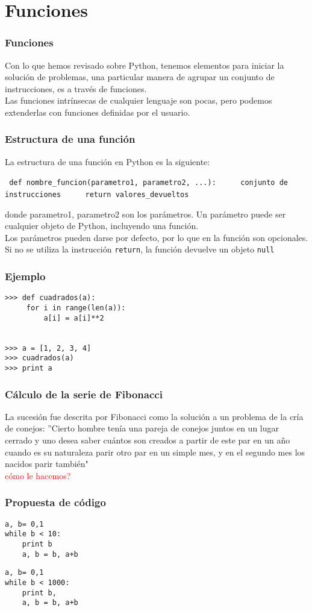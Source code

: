 \documentclass[12pt]{beamer}
\begin{document}
\section{Funciones}
\begin{frame}
\frametitle{Funciones}
Con lo que hemos revisado sobre Python, tenemos elementos para iniciar la soluci\'{o}n de problemas, una particular manera de agrupar un conjunto de instrucciones, es a trav\'{e}s de funciones.
\\
\bigskip
Las funciones intr\'{i}nsecas de cualquier lenguaje son pocas, pero podemos extenderlas con funciones definidas por el usuario.
\end{frame}
\begin{frame}[fragile]
\frametitle{Estructura de una funci\'{o}n}
La estructura de una funci\'{o}n en Python es la siguiente:
\begin{center}
\begin{exampleblock}{}
\verb| def nombre_funcion(parametro1, parametro2, ...):|
\verb|     conjunto de instrucciones|
\verb|     return valores_devueltos|
\end{exampleblock}
\end{center}
donde parametro1, parametro2 son los par\'{a}metros. Un par\'{a}metro puede ser cualquier objeto de Python, incluyendo una funci\'{o}n.
\\
\medskip
Los par\'{a}metros pueden darse por defecto, por lo que en la funci\'{o}n son opcionales. Si no se utiliza la instrucci\'{o}n \texttt{return}, la funci\'{o}n devuelve un objeto \texttt{null}
\end{frame}
\begin{frame}[fragile]
\frametitle{Ejemplo}
\begin{lstlisting}
>>> def cuadrados(a):
     for i in range(len(a)):
         a[i] = a[i]**2


>>> a = [1, 2, 3, 4]
>>> cuadrados(a)
>>> print a
\end{lstlisting}
\end{frame}
\begin{frame}
\frametitle{C\'{a}lculo de la serie de Fibonacci}
La sucesi\'{o}n fue descrita por Fibonacci como la soluci\'{o}n a un problema de la cr\'{i}a de conejos: ''Cierto hombre ten\'{i}a una pareja de conejos juntos en un lugar cerrado y uno desea saber cu\'{a}ntos son creados a partir de este par en un año cuando es su naturaleza parir otro par en un simple mes, y en el segundo mes los nacidos parir tambi\'{e}n"
\\
\bigskip
\pause
\textcolor{red}{c\'{o}mo le hacemos?}
\end{frame}
\begin{frame}[fragile]
\frametitle{Propuesta de c\'{o}digo}
\begin{lstlisting}
a, b= 0,1
while b < 10:
    print b
    a, b = b, a+b
\end{lstlisting}
\pause
\begin{lstlisting}
a, b= 0,1
while b < 1000:
    print b,
    a, b = b, a+b
\end{lstlisting}
\end{frame}
\end{document}
